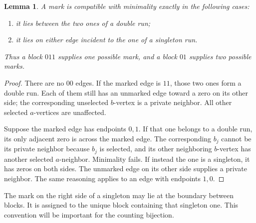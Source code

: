 \documentclass[11pt,letterpaper]{article}
\numberwithin{equation}{section}
\newtheorem{lemma}[theorem]{Lemma}
\theoremstyle{definition}
\theoremstyle{remark}
\begin{document}
\begin{lemma}\label{lem:mark}
A mark is compatible with minimality exactly in the following cases:
\begin{enumerate}[label=(\roman*)]
\item it lies between the two ones of a double run;
\item it lies on either edge incident to the one of a singleton run.
\end{enumerate}
Thus a block $011$ supplies one possible mark, and a block $01$
supplies two possible marks.
\end{lemma}
\begin{proof}
There are no $00$ edges. If the marked edge is $11$, those two ones
form a double run. Each of them still has an unmarked edge toward a
zero on its other side; the corresponding unselected $b$-vertex is
a private neighbor. All other selected $a$-vertices are unaffected.

Suppose the marked edge has endpoints $0,1$. If that one belongs to
a double run, its only adjacent zero is across the marked edge.
The corresponding $b_j$ cannot be its private neighbor because $b_j$
is selected, and its other neighboring $b$-vertex has another
selected $a$-neighbor. Minimality fails. If instead the one is a
singleton, it has zeros on both sides. The unmarked edge on its
other side supplies a private neighbor. The same reasoning applies
to an edge with endpoints $1,0$.
\end{proof}

The mark on the right side of a singleton may lie at the boundary
between blocks. It is assigned to the unique block containing that
singleton one. This convention will be important for the counting
bijection.
\end{document}
